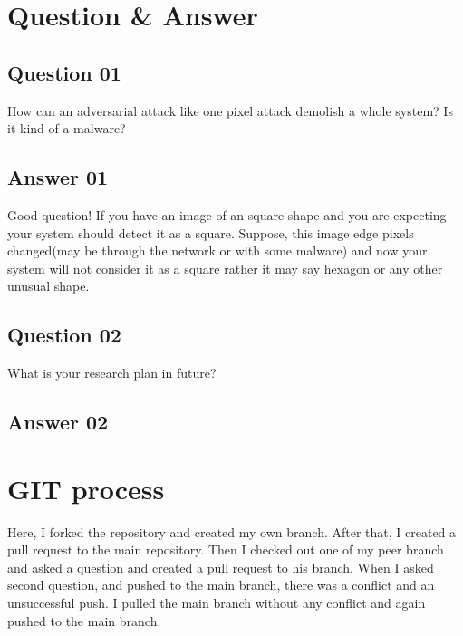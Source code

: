 \section{Question \& Answer}
\subsection{Question 01} How can an adversarial attack like one pixel attack demolish a whole system? Is it kind of a malware? 
\subsection{Answer 01}
Good question! If you have an image of an square shape and  you are expecting your system should detect it as a square. Suppose, this image edge pixels changed(may be through the network or with some malware) and now  your system will not consider it as a square rather it may say hexagon or any other unusual shape.
\subsection{Question 02}
What is your research plan in future?
\subsection{Answer 02}
\section{GIT process}
Here, I forked the repository and created my own branch. After that, I created a pull request to the main repository. Then I checked out one of my peer branch and asked a question and created a pull request to his branch. When I asked second question, and pushed to the main branch, there was a conflict and an unsuccessful push. I pulled the main branch without any conflict and again pushed to the main branch.
% 